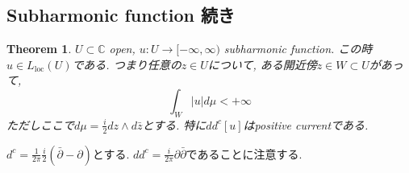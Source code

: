 \documentclass[dvipdfmx,a4paper,11pt]{report} %
\newtheorem{thm}{Theorem}[section]
\theoremstyle{definition}
\theoremstyle{remark}
\numberwithin{equation}{section}
\newcommand{\C}{\mathbb{C}}
\begin{document}
\subsection{Subharmonic function 続き}
\begin{tcolorbox}[mybox]
\begin{thm}
$U \subset \C$ open, $u : U \to [-\infty, \infty)$ subharmonic function.
この時$u \in L_{\mathrm{loc}}(U)$である. 
つまり任意の$z \in U$について, ある開近傍$z \in W \subset U$があって, 
$$
\int_{W} |u| d \mu < +\infty
$$
ただしここで$d\mu=\frac{i}{2}dz \wedge d \bar{z}$とする. 
特に$dd^c[u]$はpositive currentである. 
\end{thm}
\end{tcolorbox}
$d^c=\frac{1}{2 \pi} \frac{i}{2}(\bar{\partial} - \partial)$とする. 
$dd^c = \frac{i}{2 \pi} \partial \bar{\partial}$であることに注意する. 
\end{document}
